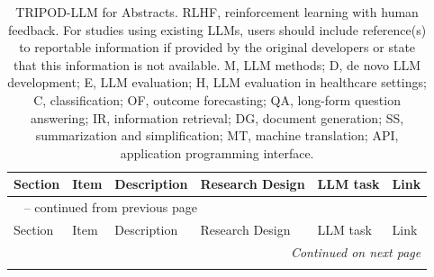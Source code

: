 \documentclass{article}
\begin{document}
\begin{longtable}{p{} l p{} l l l}
    \caption{TRIPOD-LLM for Abstracts. RLHF, reinforcement learning with human feedback. For studies using existing LLMs, users should include reference(s) to reportable information if provided by the original developers or state that this information is not available. M, LLM methods; D, de novo LLM development; E, LLM evaluation; H, LLM evaluation in healthcare settings; C, classification; OF, outcome forecasting; QA, long-form question answering; IR, information retrieval; DG, document generation; SS, summarization and simplification; MT, machine translation; API, application programming interface.}
    \label{tab:TRIPOD-LLM-Abstract}\\

    \toprule
    Section & Item & Description & Research Design & LLM task & Link \\
    \midrule
    \endfirsthead

    \multicolumn{6}{l}{\tablename~\thetable{} -- continued from previous page}\\
    \toprule
    Section & Item & Description & Research Design & LLM task & Link \\
    \midrule
    \endhead

    \midrule
    \multicolumn{6}{r}{\emph{Continued on next page}}\\
    \endfoot

    \bottomrule
    \endlastfoot



\end{longtable}
\end{document}
